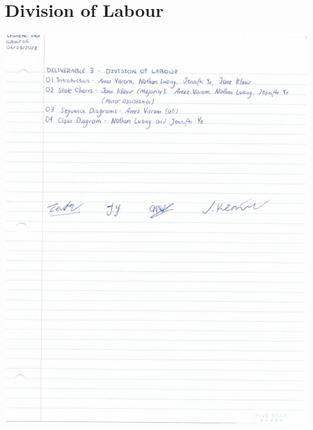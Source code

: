 \documentclass[]{article}
\begin{document}

\appendix
\section{Division of Labour}
\label{sec:division_of_labour}
\includegraphics[scale=0.7]{images/DivisionOfLabour.jpg}
\end{document}
